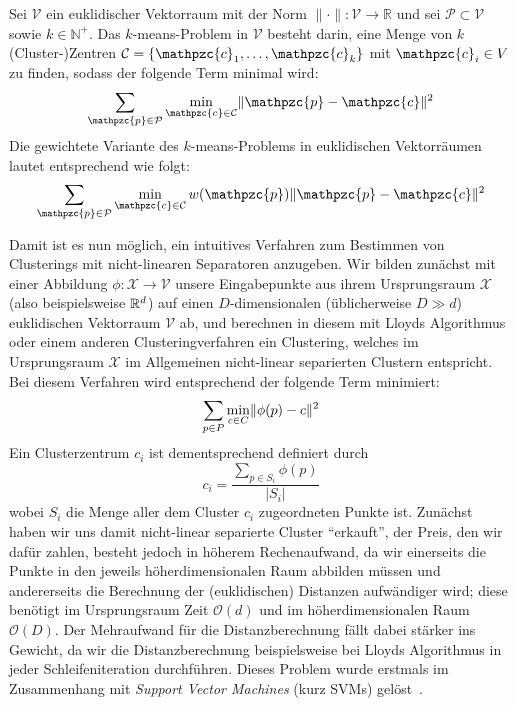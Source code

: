 \begin{definition}
\label{def:kmeans-kmedian-innerproduct}
Sei $\mathcal{V}$ ein euklidischer Vektorraum mit der Norm $\lVert \cdot \rVert : \mathcal{V} \rightarrow \mathbb{R}$
und sei $\mathcal{P} \subset \mathcal{V}$ sowie $k \in \mathbb{N}^{+}$.
Das $k$-means-Problem in $\mathcal{V}$ besteht darin, eine Menge von $k$ (Cluster-)Zentren
$\mathcal{C} = \{ \mathpzc{c}_1, \dots, \mathpzc{c}_k \}$ mit $\mathpzc{c}_i \in V$ zu finden, sodass der folgende Term
minimal wird:
\[ \sum_{\mathpzc{p} \in \mathcal{P}} \min_{\mathpzc{c} \in \mathcal{C}} \EuclidSquared{\mathpzc{p}}{\mathpzc{c}} \]
Die gewichtete Variante des $k$-means-Problems in euklidischen Vektorräumen lautet entsprechend wie folgt:
\[ \sum_{\mathpzc{p} \in \mathcal{P}} \min_{\mathpzc{c} \in \mathcal{C}} w(\mathpzc{p})
	\EuclidSquared{\mathpzc{p}}{\mathpzc{c}} \]
\end{definition}
Damit ist es nun möglich, ein intuitives Verfahren zum Bestimmen von Clusterings mit nicht-linearen Separatoren anzugeben.
Wir bilden zunächst mit einer Abbildung $\phi : \mathcal{X} \rightarrow \mathcal{V}$ unsere Eingabepunkte aus ihrem Ursprungsraum
$\mathcal{X}$ (also beispielsweise $\mathbb{R}^{d}$) auf einen $D$-dimensionalen (üblicherweise $D \gg d$) euklidischen
Vektorraum $\mathcal{V}$ ab, und berechnen in diesem mit Lloyds Algorithmus oder einem anderen Clusteringverfahren ein
Clustering, welches im Ursprungsraum $\mathcal{X}$ im Allgemeinen nicht-linear separierten Clustern entspricht.
Bei diesem Verfahren wird entsprechend der folgende Term minimiert:
\[ \sum_{p \in P} \min_{c \in C} \lVert {\phi(p)} - {c} \rVert^2 \]
Ein Clusterzentrum $c_i$ ist dementsprechend definiert durch
\[ c_i = \frac{\sum_{p \in S_i} \phi(p)}{\left|S_i\right|} \]
wobei $S_i$ die Menge aller dem Cluster $c_i$ zugeordneten Punkte ist. Zunächst haben wir uns damit nicht-linear separierte
Cluster "`erkauft"', der Preis, den wir dafür zahlen, besteht jedoch in höherem Rechenaufwand, da wir einerseits die Punkte
in den jeweils höherdimensionalen Raum abbilden müssen und andererseits die Berechnung der (euklidischen) Distanzen aufwändiger
wird; diese benötigt im Ursprungsraum Zeit $\mathcal{O}(d)$ und im höherdimensionalen Raum $\mathcal{O}(D)$. Der Mehraufwand
für die Distanzberechnung fällt dabei stärker ins Gewicht, da wir die Distanzberechnung beispielsweise bei Lloyds Algorithmus
in jeder Schleifeniteration durchführen.
\absatz
Dieses Problem wurde erstmals im Zusammenhang mit \emph{Support Vector Machines} (kurz SVMs) gelöst~\cite{BoserGV92}.
